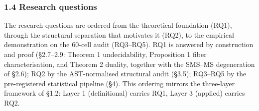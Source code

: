 \documentclass[review,12pt,authoryear]{elsarticle}
\begin{document}
\subsubsection{1.4 Research questions}\label{research-questions}

The research questions are ordered from the theoretical foundation
(RQ1), through the structural separation that motivates it (RQ2), to the
empirical demonstration on the 60-cell audit (RQ3--RQ5). RQ1 is answered
by construction and proof (§2.7--2.9: Theorem 1 undecidability,
Proposition 1 fiber characterisation, and Theorem 2 duality, together
with the SMS--MS degeneration of §2.6); RQ2 by the
AST-normalised structural audit (§3.5); RQ3--RQ5 by the pre-registered
statistical pipeline (§4). This ordering mirrors the three-layer
framework of §1.2: Layer 1 (definitional) carries RQ1, Layer 3 (applied)
carries RQ2.
\end{document}
